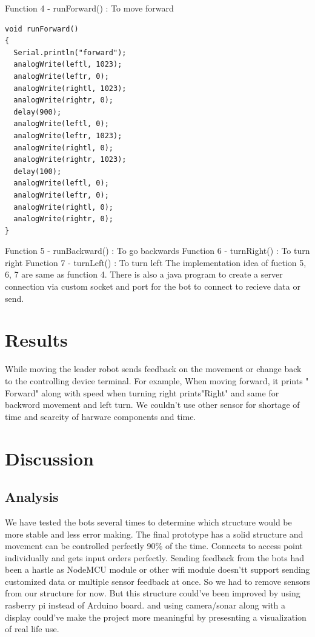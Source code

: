 \documentclass{Resources/UoBLab1}
\begin{document}
Function 4 - runForward() : To move forward\newline
\begin{lstlisting}
void runForward()
{
  Serial.println("forward");
  analogWrite(leftl, 1023);
  analogWrite(leftr, 0);
  analogWrite(rightl, 1023);
  analogWrite(rightr, 0);
  delay(900);
  analogWrite(leftl, 0);
  analogWrite(leftr, 1023);
  analogWrite(rightl, 0);
  analogWrite(rightr, 1023);
  delay(100);
  analogWrite(leftl, 0);
  analogWrite(leftr, 0);
  analogWrite(rightl, 0);
  analogWrite(rightr, 0);
}
\end{lstlisting}
Function 5 - runBackward() : To go backwards\newline\newline
Function 6 - turnRight() : To turn right\newline\newline
Function 7 - turnLeft()  : To turn left\newline\newline
The implementation idea of fuction 5, 6, 7 are same as function 4.
There is also a java program to create a server connection via custom socket and port for the bot to connect to recieve data or send.

\section{Results}
While moving the leader robot sends feedback on the movement or change back to the controlling device terminal. For example, When moving forward, it prints " Forward" along with speed when turning right prints"Right" and same for backword  movement and left turn. We couldn't use other sensor for shortage of time and scarcity of harware components and time.

\section{Discussion} 
\subsection{Analysis}
We have tested the bots several times to determine which structure would be more stable and less error making. The final prototype has a solid structure and movement can be controlled perfectly 90\% of the time. Connects to access point individually and gets input orders perfectly. Sending feedback from the bots had been a hastle as NodeMCU module or other wifi module doesn'tt support sending customized data or multiple sensor feedback at once. So we had to remove sensors from our structure for now. But this structure could've been improved by using rasberry pi instead of Arduino board. and using camera/sonar along with a display could've make the project more meaningful by presesnting a visualization of real life use.
\end{document}
